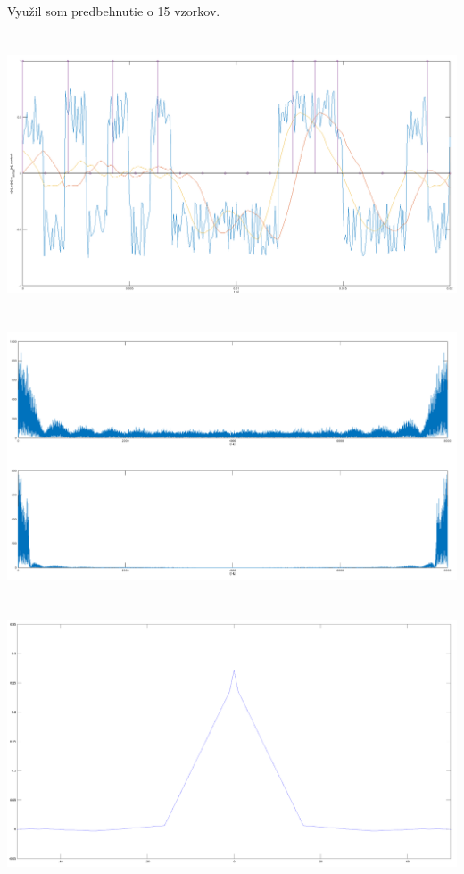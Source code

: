 \documentclass[a4paper,12pt,twocolumn]{article}
\begin{document}
\section{}
Využil som predbehnutie o 15 vzorkov.
\section{}
\includegraphics[width=\linewidth]{6}
\section{}
\section{}
\includegraphics[width=\linewidth]{8}
\section{}
\section{}
\includegraphics[width=\linewidth]{10}
\end{document}
